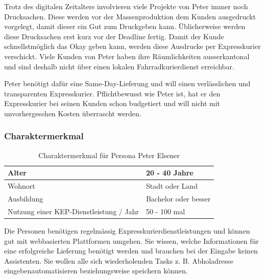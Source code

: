 Trotz des digitalen Zeitalters involvieren viele Projekte von Peter immer noch Drucksachen. Diese werden vor der Massenproduktion dem Kunden ausgedruckt vorgelegt, damit dieser ein \glqq{}Gut zum Druck\grqq geben kann. Üblicherweise werden diese Drucksachen erst kurz vor der Deadline fertig. Damit der Kunde schnellstmöglich das Okay geben kann, werden diese Ausdrucke per Expresskurier verschickt. Viele Kunden von Peter haben ihre Räumlichkeiten ausserkantonal und sind deshalb nicht über einen lokalen Fahrradkurierdienst erreichbar.

Peter benötigt dafür eine Same-Day-Lieferung und will einen verlässlichen und transparenten Expresskurier. Pflichtbewusst wie Peter ist, hat er den Expresskurier bei seinen Kunden schon budgetiert und will nicht mit unvorhergesehen Kosten überrascht werden.

\subsubsection{Charaktermerkmal}
\begin{table}[]
\centering

\label{my-label}
\begin{tabular}{|l|l|}
\hline
Alter                                   & 20 - 40 Jahre        \\ \hline
Wohnort                                 & Stadt oder Land         \\ \hline
Ausbildung                              & Bachelor oder besser \\ \hline
Nutzung einer KEP-Dienstleistung / Jahr & 50 - 100 mal            \\ \hline
\end{tabular}
\caption{Charaktermerkmal für Persona Peter Elsener}
\end{table}

Die Personen benötigen regelmässig Expresskurierdienstleistungen und können gut mit webbasierten Plattformen umgehen. Sie wissen, welche Informationen für eine erfolgreiche Lieferung benötigt werden und brauchen bei der Eingabe keinen Assistenten. Sie wollen alle sich wiederholenden Tasks z. B. \glqq Abholadresse eingeben\grqq automatisieren beziehungsweise speichern können.

